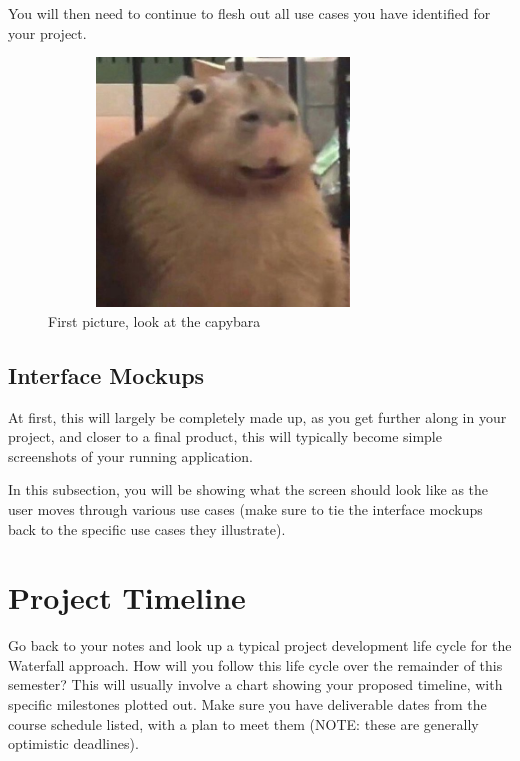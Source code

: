 \documentclass[10pt,conference,onecolumn,compsoc]{IEEEtran}
\begin{document}
You will then need to continue to flesh out all use cases you have identified for your project.

\begin{figure}[ht!]
\includegraphics[height=250px, width=350px]{capybara1.jpg}
\caption{First picture, look at the capybara}
\label{capybara1}
\end{figure}

\subsection{Interface Mockups}
At first, this will largely be completely made up, as you get further along in your project, and closer to a final product, this will typically become simple screenshots of your running application.

In this subsection, you will be showing what the screen should look like as the user moves through various use cases (make sure to tie the interface mockups back to the specific use cases they illustrate).



\section{Project Timeline}
Go back to your notes and look up a typical project development life cycle for the Waterfall approach.  How will you follow this life cycle over the remainder of this semester?  This will usually involve a chart showing your proposed timeline, with specific milestones plotted out.  Make sure you have deliverable dates from the course schedule listed, with a plan to meet them (NOTE: these are generally optimistic deadlines).



\end{document}
